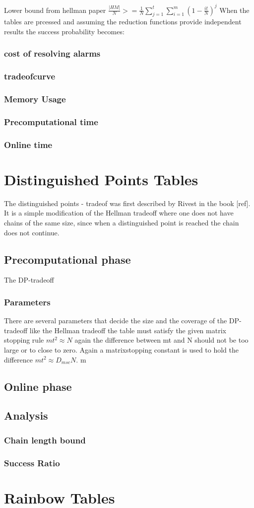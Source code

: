 Lower bound from hellman paper
$\frac{|HM|}{N}>=\frac{1}{N}\sum^{t}_{j=1}\sum^{m}_{i=1}(1-\frac{it}{N})^{j} $
When the tables are prcessed and assuming the reduction functions provide independent results the success probability becomes:


\subsubsection{cost of resolving alarms}
\subsubsection{tradeofcurve}
\subsubsection{Memory Usage}
\subsubsection{Precomputational time}
\subsubsection{Online time}

\section{Distinguished Points Tables}
The distinguished points - tradeof was first described by Rivest in
the book [ref]. It is a simple modification of the Hellman tradeoff
where one does not have chains of the same size, since when a
distinguished point is reached the chain does not continue.
\subsection{Precomputational phase}
The DP-tradeoff
\subsubsection{Parameters}
There are several parameters that decide the size and the coverage of
the DP-tradeoff like the Hellman tradeoff the table must satisfy the
given matrix stopping rule $mt^2\approx N$ again the difference between
mt and N should not be too large or to close to zero. Again a
matrixstopping constant is used to hold the difference $mt^2\approx
D_{msc}N$. m 
\subsection{Online phase}
\subsection{Analysis}
\subsubsection{Chain length bound}
\subsubsection{Success Ratio}
\subsubsection{}
\section{Rainbow Tables}
